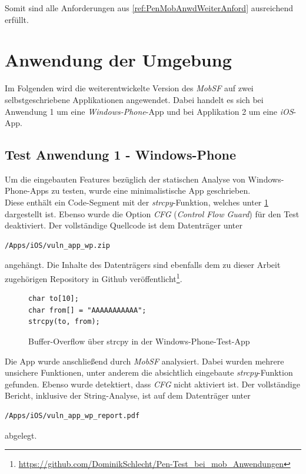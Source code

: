 Somit sind alle Anforderungen aus \ref{ref:PenMobAnwdWeiterAnford} ausreichend erfüllt.


\section{Anwendung der Umgebung}
	Im Folgenden wird die weiterentwickelte Version des \textit{MobSF} auf zwei selbstgeschriebene Applikationen angewendet. Dabei handelt es sich bei Anwendung 1 um eine \textit{Windows-Phone}-App und bei Applikation 2 um eine \textit{iOS}-App.

	\subsection{Test Anwendung 1 - Windows-Phone}
	Um die eingebauten Features bezüglich der statischen Analyse von Windows-Phone-Apps zu testen, wurde eine minimalistische App geschrieben.\\
	
	Diese enthält ein Code-Segment mit der \textit{strcpy}-Funktion, welches unter \ref{lst:PenMobAnwWinStrcpy} dargestellt ist. Ebenso wurde die Option \textit{CFG} (\textit{Control Flow Guard}) für den Test deaktiviert. Der vollständige Quellcode ist dem Datenträger unter 
\begin{lstlisting}
/Apps/iOS/vuln_app_wp.zip
\end{lstlisting} angehängt. Die Inhalte des Datenträgers sind ebenfalls dem zu dieser Arbeit zugehörigen Repository in Github veröffentlicht\footnote{\url{https://github.com/DominikSchlecht/Pen-Test_bei_mob_Anwendungen}}.\\
	
\begin{figure}
\begin{lstlisting}
char to[10];
char from[] = "AAAAAAAAAAA";
strcpy(to, from);
\end{lstlisting}
\caption{Buffer-Overflow über strcpy in der Windows-Phone-Test-App}
\label{lst:PenMobAnwWinStrcpy}
\end{figure}
	
	Die App wurde anschließend durch \textit{MobSF} analysiert. Dabei wurden mehrere unsichere Funktionen, unter anderem die absichtlich eingebaute \textit{strcpy}-Funktion gefunden. Ebenso wurde detektiert, dass \textit{CFG} nicht aktiviert ist. Der vollständige Bericht, inklusive der String-Analyse, ist auf dem Datenträger unter \begin{lstlisting}
/Apps/iOS/vuln_app_wp_report.pdf
\end{lstlisting} abgelegt.
	
